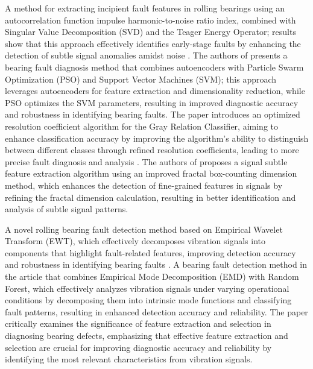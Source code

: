 \documentclass[sn-basic,pdflatex]{sn-jnl}
\theoremstyle{remark}
\theoremstyle{definition}
\begin{document}
A method for extracting incipient fault features in rolling bearings
using an autocorrelation function impulse harmonic-to-noise ratio index,
combined with Singular Value Decomposition (SVD) and the Teager Energy
Operator; results show that this approach effectively identifies
early-stage faults by enhancing the detection of subtle signal anomalies
amidst noise \citep{WOS:000416794600016}. The authors of
\citep{WOS:000484465800028} presents a bearing fault diagnosis method
that combines autoencoders with Particle Swarm Optimization (PSO) and
Support Vector Machines (SVM); this approach leverages autoencoders for
feature extraction and dimensionality reduction, while PSO optimizes the
SVM parameters, resulting in improved diagnostic accuracy and robustness
in identifying bearing faults. The paper introduces an optimized
resolution coefficient algorithm for the Gray Relation Classifier,
aiming to enhance classification accuracy by improving the algorithm's
ability to distinguish between different classes through refined
resolution coefficients, leading to more precise fault diagnosis and
analysis \citep{WOS:000477760600037}. The authors of
\citep{WOS:000477760600061} proposes a signal subtle feature extraction
algorithm using an improved fractal box-counting dimension method, which
enhances the detection of fine-grained features in signals by refining
the fractal dimension calculation, resulting in better identification
and analysis of subtle signal patterns.

A novel rolling bearing fault detection method based on Empirical
Wavelet Transform (EWT), which effectively decomposes vibration signals
into components that highlight fault-related features, improving
detection accuracy and robustness in identifying bearing faults
\citep{WOS:000467079500501}. A bearing fault detection method in the
article \citep{WOS:000459864800144} that combines Empirical Mode
Decomposition (EMD) with Random Forest, which effectively analyzes
vibration signals under varying operational conditions by decomposing
them into intrinsic mode functions and classifying fault patterns,
resulting in enhanced detection accuracy and reliability. The paper
\citep{WOS:000458657500187} critically examines the significance of
feature extraction and selection in diagnosing bearing defects,
emphasizing that effective feature extraction and selection are crucial
for improving diagnostic accuracy and reliability by identifying the
most relevant characteristics from vibration signals.
\end{document}
